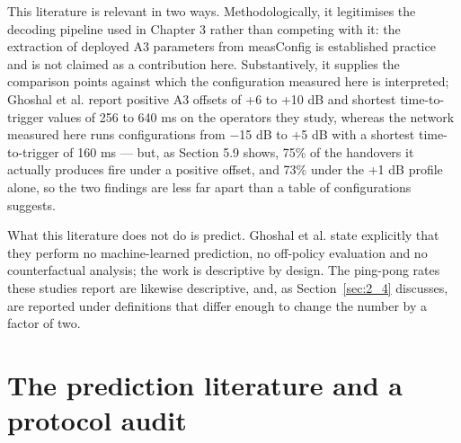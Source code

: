 This literature is relevant in two ways. Methodologically, it legitimises the decoding pipeline used in Chapter 3 rather than competing with it: the extraction of deployed A3 parameters from measConfig is established practice and is not claimed as a contribution here. Substantively, it supplies the comparison points against which the configuration measured here is interpreted; Ghoshal et al. report positive A3 offsets of +6 to +10 dB and shortest time-to-trigger values of 256 to 640 ms on the operators they study, whereas the network measured here runs configurations from $-$15 dB to +5 dB with a shortest time-to-trigger of 160 ms --- but, as Section 5.9 shows, 75\% of the handovers it actually produces fire under a positive offset, and 73\% under the +1 dB profile alone, so the two findings are less far apart than a table of configurations suggests.

What this literature does not do is predict. Ghoshal et al. state explicitly that they perform no machine-learned prediction, no off-policy evaluation and no counterfactual analysis; the work is descriptive by design. The ping-pong rates these studies report are likewise descriptive, and, as Section~\ref{sec:2_4} discusses, are reported under definitions that differ enough to change the number by a factor of two.


\section{The prediction literature and a protocol audit}
\label{sec:2_3}

